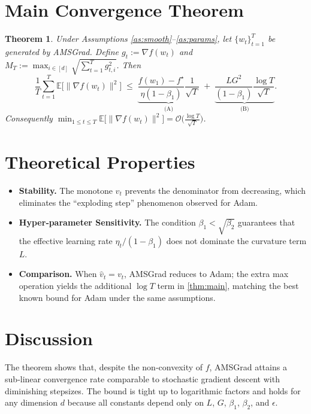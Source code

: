 \documentclass{article}
\newtheorem{theorem}{Theorem}
\newcommand{\EE}{\mathbb{E}}
\begin{document}
\section*{Main Convergence Theorem}
\begin{theorem}\label{thm:main}
Under Assumptions \ref{as:smooth}–\ref{as:params},
let $\{w_t\}_{t=1}^T$ be generated by AMSGrad.
Define $g_t:=\nabla f(w_t)$ and $M_T:=\max_{i\in[d]}\sqrt{\sum_{t=1}^T g_{t,i}^2}$.
Then
\[
\frac{1}{T}\sum_{t=1}^T\EE\!\big[\|\nabla f(w_t)\|^2\big]
\;\le\;
\underbrace{\frac{f(w_1)-f^\star}{\eta(1-\beta_1)}\frac{1}{\sqrt{T}}}_{\displaystyle\text{(A)}}
\;+\;
\underbrace{\frac{L G^2}{(1-\beta_1)}\frac{\log T}{\sqrt{T}}}_{\displaystyle\text{(B)}}.
\]
Consequently $\displaystyle\min_{1\le t\le T}\EE\!\big[\|\nabla f(w_t)\|^2\big]=\mathcal O\!\big(\tfrac{\log T}{\sqrt{T}}\big)$.
\end{theorem}

\section*{Theoretical Properties}
\begin{itemize}
\item \textbf{Stability.} The monotone $\hat v_t$ prevents the denominator from decreasing,
which eliminates the “exploding step” phenomenon observed for Adam.
\item \textbf{Hyper‑parameter Sensitivity.}
The condition $\beta_1<\sqrt{\beta_2}$ guarantees that the effective
learning rate $\eta_t/(1-\beta_1)$ does not dominate the curvature term $L$.
\item \textbf{Comparison.}
When $\hat v_t=v_t$, AMSGrad reduces to Adam; the extra max operation yields the additional
$\log T$ term in \eqref{thm:main}, matching the best known bound for Adam under the same
assumptions.
\end{itemize}

\section*{Discussion}
The theorem shows that, despite the non‑convexity of $f$, AMSGrad attains a
sub‑linear convergence rate comparable to stochastic gradient descent
with diminishing stepsizes. The bound is tight up to logarithmic factors
and holds for any dimension $d$ because all constants depend only on
$L$, $G$, $\beta_1$, $\beta_2$, and $\epsilon$.
\end{document}
